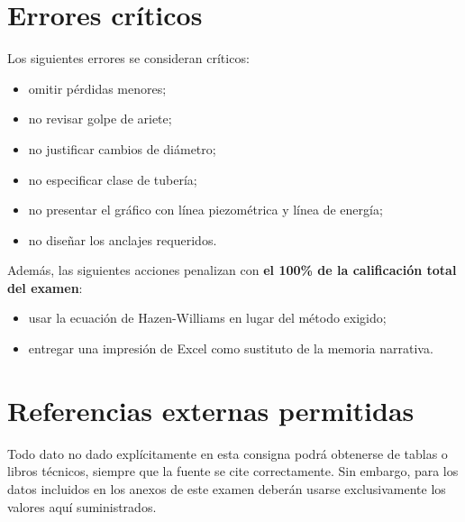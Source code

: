 \documentclass[11pt]{article}
\begin{document}
\section{Errores críticos}
\begin{warnbox}
Los siguientes errores se consideran críticos:
\begin{itemize}
\item omitir pérdidas menores;
\item no revisar golpe de ariete;
\item no justificar cambios de diámetro;
\item no especificar clase de tubería;
\item no presentar el gráfico con línea piezométrica y línea de energía;
\item no diseñar los anclajes requeridos.
\end{itemize}

Además, las siguientes acciones penalizan con \textbf{el 100\% de la calificación total del examen}:
\begin{itemize}
\item usar la ecuación de Hazen-Williams en lugar del método exigido;
\item entregar una impresión de Excel como sustituto de la memoria narrativa.
\end{itemize}
\end{warnbox}

\section{Referencias externas permitidas}
Todo dato no dado explícitamente en esta consigna podrá obtenerse de tablas o libros técnicos, siempre que la fuente se cite correctamente. Sin embargo, para los datos incluidos en los anexos de este examen deberán usarse exclusivamente los valores aquí suministrados.

\clearpage
\tableofcontents
\clearpage

\end{document}
